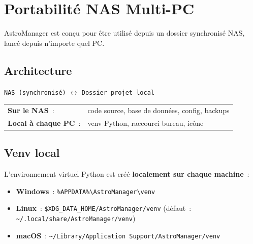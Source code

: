 \documentclass[a4paper,11pt]{article}
\begin{document}
\section{Portabilit\'{e} NAS Multi-PC}
\label{sec:nas}

AstroManager est con\c{c}u pour \^{e}tre utilis\'{e} depuis un dossier synchronis\'{e} NAS, lanc\'{e} depuis n'importe quel PC.

\subsection{Architecture}

\begin{center}
\begin{tcolorbox}[
    enhanced, width=13cm,
    colback=mainblue!3, colframe=mainblue!30,
    arc=5pt, boxrule=0.5pt
]
\begin{center}
\texttt{NAS (synchronis\'{e})} $\longleftrightarrow$ \texttt{Dossier projet local}\\[0.3cm]
\small
\begin{tabular}{ll}
\textbf{Sur le NAS}~: & code source, base de donn\'{e}es, config, backups \\
\textbf{Local \`{a} chaque PC}~: & venv Python, raccourci bureau, ic\^{o}ne \\
\end{tabular}
\end{center}
\end{tcolorbox}
\end{center}

\subsection{Venv local}

L'environnement virtuel Python est cr\'{e}\'{e} \textbf{localement sur chaque machine}~:

\begin{itemize}
    \item \textbf{Windows}~: \texttt{\%APPDATA\%\textbackslash AstroManager\textbackslash venv}
    \item \textbf{Linux}~: \texttt{\$XDG\_DATA\_HOME/AstroManager/venv} (d\'{e}faut~: \texttt{\textasciitilde/.local/share/AstroManager/venv})
    \item \textbf{macOS}~: \texttt{\textasciitilde/Library/Application Support/AstroManager/venv}
\end{itemize}
\end{document}
